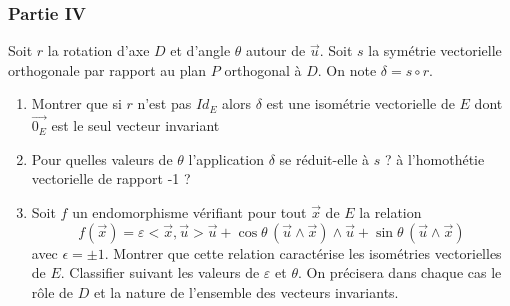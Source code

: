 \subsubsection*{Partie IV}
Soit $r$ la rotation d'axe $D$ et d'angle $\theta$ autour de $\overrightarrow{u}$. Soit $s$ la sym{\'e}trie vectorielle orthogonale par rapport au plan $P$ orthogonal {\`a} $D$. On note $\delta = s\circ r$.
\begin{enumerate}
  \item Montrer que si $r$ n'est pas $Id_E$ alors $\delta$ est une  isom{\'e}trie vectorielle de $E$ dont $\overrightarrow{0_E}$ est le  seul vecteur invariant
  \item Pour quelles valeurs de $\theta$ l'application $\delta$ se  r{\'e}duit-elle {\`a} $s$ ? {\`a} l'homoth{\'e}tie vectorielle de rapport -1 ?
  \item Soit $f$ un endomorphisme v{\'e}rifiant pour tout  $\overrightarrow{x}$ de $E$ la relation
  \[f(\overrightarrow{x})
    =\varepsilon<\overrightarrow{x},\overrightarrow{u}> \overrightarrow{u}
     + \cos \theta \,(\overrightarrow{u}\wedge\overrightarrow{x})\wedge \overrightarrow{u}
     + \sin \theta \,(\overrightarrow{u}\wedge\overrightarrow{x})\]
  avec $\epsilon=\pm 1$. \newline
  Montrer que cette relation caract{\'e}rise les isom{\'e}tries  vectorielles de $E$. Classifier suivant les valeurs de
  $\varepsilon$ et $\theta$. On pr{\'e}cisera dans chaque cas le r{\^o}le de  $D$ et la nature de l'ensemble des vecteurs invariants.
\end{enumerate}
